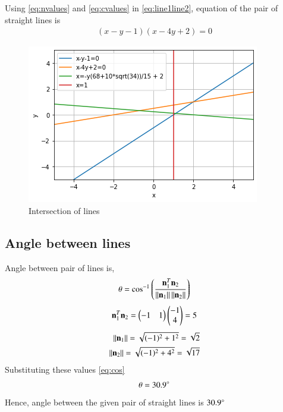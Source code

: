 \documentclass[journal,12pt,twocolumn]{IEEEtran}
\begin{document}
Using \eqref{eq:nvalues} and \eqref{eq:cvalues} in \eqref{eq:line1line2}, equation of the pair of straight lines is
\begin{align}
    (x-y-1)(x-4y+2) = 0
\end{align}
\renewcommand{\thefigure}{1}
\begin{figure}[h!]
    \centering
    \includegraphics[width=\columnwidth]{assignment3.png}
    \caption{Intersection of lines}
    \label{fig:fig1}
\end{figure}
\subsection{Angle between lines}
Angle between pair of lines is,
\begin{align}\label{eq:cos}
    \theta = \cos^{-1}\left(\frac{\mathbf{n}_1^T\mathbf{n}_2}{\left\lVert\mathbf{n}_1\right\rVert\left\lVert\mathbf{n}_2\right\rVert}\right)
\end{align}
\begin{align}
    \mathbf{n}_1^T\mathbf{n}_2 = \begin{pmatrix}-1 & 1\end{pmatrix}\begin{pmatrix}-1 \\ 4\end{pmatrix} = 5 \label{eq:a2} 
\end{align}
\begin{align}
    \left\lVert\mathbf{n}_1\right\rVert=\sqrt{(-1)^2+1^2}=\sqrt{2}\\
    \left\lVert\mathbf{n}_2\right\rVert=\sqrt{(-1)^2+4^2}=\sqrt{17} \label{eq:}
\end{align}
Substituting these values \eqref{eq:cos}
\begin{align}
    \theta = 30.9\degree
\end{align}
Hence, angle between the given pair of straight lines is $30.9\degree$
\end{document}
